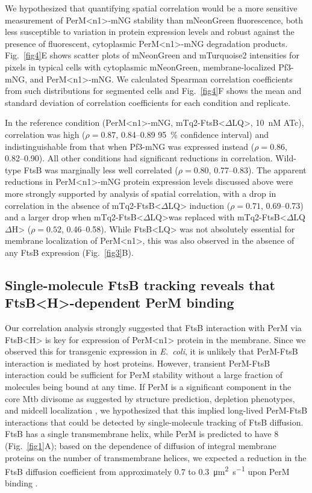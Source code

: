 \documentclass[pdflatex,sn-nature]{sn-jnl}%
\def\textsuperscript#1{<#1>}%
\newcommand\ec{\textit{E.~coli}}
\newcommand\mtb{Mtb}
\newcommand\ftsbLQ{FtsB\textsuperscript{LQ}}
\newcommand\ftsbH{FtsB\textsuperscript{H}}
\newcommand\ftsbdLQ{FtsB\textsuperscript{$\Delta{}$LQ}}
\newcommand\ftsbdLQdH{FtsB\textsuperscript{$\Delta{}$LQ$\Delta{}$H}}
\newcommand\permN{PerM\textsuperscript{n1}}
\begin{document}
We hypothesized that quantifying spatial correlation would be a more sensitive measurement of \permN{}-mNG stability than mNeonGreen fluorescence, both less susceptible to variation in protein expression levels and robust against the presence of fluorescent, cytoplasmic \permN{}-mNG degradation products.
Fig.~\ref{fig4}E shows scatter plots of mNeonGreen and mTurquoise2 intensities for pixels in typical cells with cytoplasmic mNeonGreen, membrane-localized Pf3-mNG, and \permN{}-mNG.
We calculated Spearman correlation coefficients from such distributions for segmented cells and Fig.~\ref{fig4}F shows the mean and standard deviation of correlation coefficients for each condition and replicate.

In the reference condition (\permN{}-mNG, mTq2-\ftsbdLQ{}, \qty{10}{nM} ATc), correlation was high ($\rho = 0.87$, 0.84--0.89 \qty{95}{\percent} confidence interval) and indistinguishable from that when Pf3-mNG was expressed instead ($\rho = 0.86$, 0.82--0.90).
All other conditions had significant reductions in correlation. Wild-type FtsB was marginally less well correlated ($\rho = 0.80$, 0.77--0.83).
The apparent reductions in \permN{}-mNG protein expression levels discussed above were more strongly supported by analysis of spatial correlation, with a drop in correlation in the absence of mTq2-\ftsbdLQ{} induction ($\rho = 0.71$, 0.69--0.73) and a larger drop when mTq2-\ftsbdLQ was replaced with mTq2-\ftsbdLQdH{} ($\rho = 0.52$, 0.46--0.58).
While \ftsbLQ{} was not absolutely essential for membrane localization of \permN{}, this was also observed in the absence of any FtsB expression (Fig.~\ref{fig3}B).

\subsection{Single-molecule FtsB tracking reveals that \ftsbH{}-dependent PerM binding}

Our correlation analysis strongly suggested that FtsB interaction with PerM via \ftsbH{} is key for expression of \permN{} protein in the membrane.
Since we observed this for transgenic expression in \ec{}, it is unlikely that PerM-FtsB interaction is mediated by host proteins.
However, transient PerM-FtsB interaction could be sufficient for PerM stability without a large fraction of molecules being bound at any time.
If PerM is a significant component in the core \mtb{} divisome as suggested by structure prediction, depletion phenotypes, and midcell localization \citep{goodsmithDisruptionTuberculosisMembrane2015, wangPersistentMycobacteriumTuberculosis2019}, we hypothesized that this implied long-lived PerM-FtsB interactions that could be detected by single-molecule tracking of FtsB diffusion.
FtsB has a single transmembrane helix, while PerM is predicted to have 8 (Fig.~\ref{fig1}A); based on the dependence of diffusion of integral membrane proteins on the number of transmembrane helices, we expected a reduction in the FtsB diffusion coefficient from approximately 0.7 to \qty{0.3}{\square\um\per\s} upon PerM binding \citep{lucenaMicrodomainFormationGeneral2018}.
\end{document}
